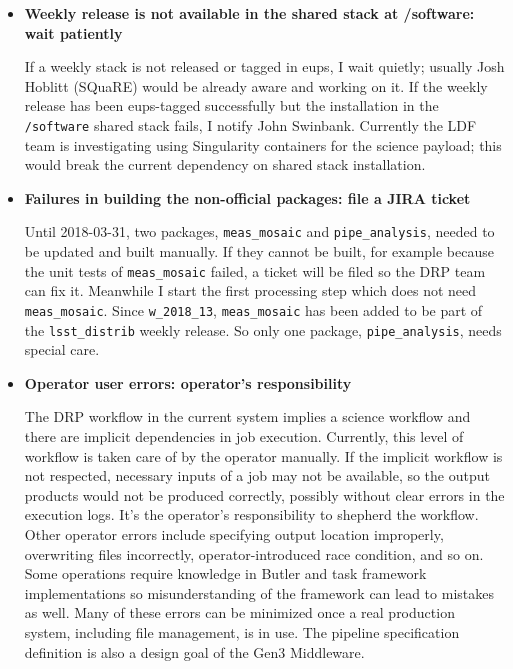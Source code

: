 \documentclass[DM,authoryear,toc]{lsstdoc}
\begin{document}
\begin{itemize}
  \item \textbf{Weekly release is not available in the shared stack
  at /software: wait patiently}

  If a weekly stack is not released or tagged in eups, I wait
  quietly; usually Josh Hoblitt (SQuaRE) would be already aware and
  working on it. If the weekly release has been eups-tagged
  successfully but the installation in the \texttt{/software} shared stack
  fails, I notify John Swinbank.  Currently the LDF team is investigating
  using Singularity containers for the science payload; this would
  break the current dependency on shared stack installation.

  \item \textbf{Failures in building the non-official packages:
  file a JIRA ticket}

  Until 2018-03-31, two packages, \texttt{meas\_mosaic} and
  \texttt{pipe\_analysis},
  needed to be updated and built manually. If they cannot be built,
  for example because the unit tests of \texttt{meas\_mosaic} failed, a
  ticket will be filed so the DRP team can fix it. Meanwhile I start
  the first processing step which does not need \texttt{meas\_mosaic}. Since
  \texttt{w\_2018\_13}, \texttt{meas\_mosaic} has been added to be part of the
  \texttt{lsst\_distrib} weekly release.  So only one package,
  \texttt{pipe\_analysis}, needs special care.

  \item \textbf{Operator user errors: operator’s responsibility}

  The DRP workflow in the current system implies a science workflow
  and there are implicit dependencies in job execution. Currently,
  this level of workflow is taken care of by the operator manually.
  If the implicit workflow is not respected, necessary inputs of a
  job may not be available, so the output products would not be
  produced correctly, possibly without clear errors in the execution
  logs. It’s the operator’s responsibility to shepherd the workflow.
  Other operator errors include specifying output location improperly,
  overwriting files incorrectly, operator-introduced race condition,
  and so on. Some operations require knowledge in Butler and task
  framework implementations so  misunderstanding of the framework
  can lead to mistakes as well. Many of these errors can be minimized
  once a real production system, including file management, is in
  use. The pipeline specification definition is also a design goal
  of the Gen3 Middleware.


\end{itemize}
\end{document}
